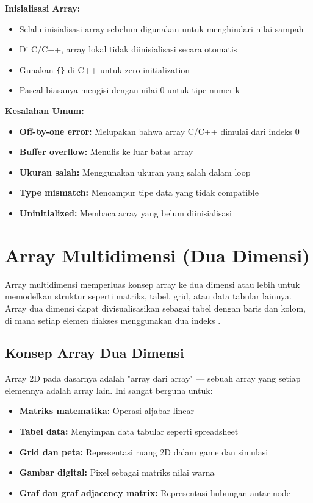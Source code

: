 \documentclass[../main.tex]{subfiles}
\begin{document}
\textbf{Inisialisasi Array:}
\begin{itemize}
  \item Selalu inisialisasi array sebelum digunakan untuk menghindari nilai sampah
  \item Di C/C++, array lokal tidak diinisialisasi secara otomatis
  \item Gunakan \texttt{\{\}} di C++ untuk zero-initialization
  \item Pascal biasanya mengisi dengan nilai 0 untuk tipe numerik
\end{itemize}

\textbf{Kesalahan Umum:}
\begin{itemize}
  \item \textbf{Off-by-one error:} Melupakan bahwa array C/C++ dimulai dari indeks 0
  \item \textbf{Buffer overflow:} Menulis ke luar batas array
  \item \textbf{Ukuran salah:} Menggunakan ukuran yang salah dalam loop
  \item \textbf{Type mismatch:} Mencampur tipe data yang tidak compatible
  \item \textbf{Uninitialized:} Membaca array yang belum diinisialisasi
\end{itemize}

\section{Array Multidimensi (Dua Dimensi)}

Array multidimensi memperluas konsep array ke dua dimensi atau lebih untuk memodelkan struktur seperti matriks, tabel, grid, atau data tabular lainnya. Array dua dimensi dapat divisualisasikan sebagai tabel dengan baris dan kolom, di mana setiap elemen diakses menggunakan dua indeks \parencite{iso-c-draft-n1570,cpp-reference,tutorialspoint-2d-arrays,duniailkom-cpp-2d-array}.

\subsection{Konsep Array Dua Dimensi}

Array 2D pada dasarnya adalah "array dari array" --- sebuah array yang setiap elemennya adalah array lain. Ini sangat berguna untuk:
\begin{itemize}
  \item \textbf{Matriks matematika:} Operasi aljabar linear
  \item \textbf{Tabel data:} Menyimpan data tabular seperti spreadsheet
  \item \textbf{Grid dan peta:} Representasi ruang 2D dalam game dan simulasi
  \item \textbf{Gambar digital:} Pixel sebagai matriks nilai warna
  \item \textbf{Graf dan graf adjacency matrix:} Representasi hubungan antar node
\end{itemize}
\end{document}
